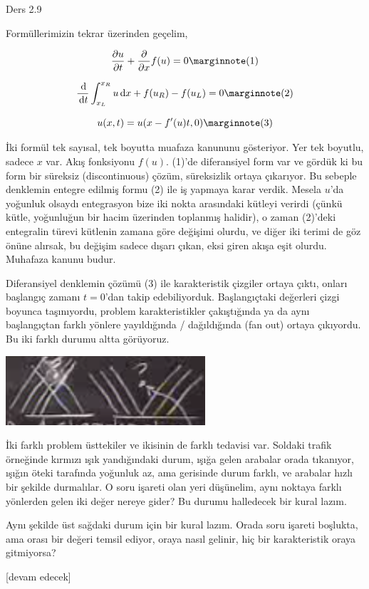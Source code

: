 \documentclass[12pt,fleqn]{article}\usepackage{../../common}
\begin{document}
Ders 2.9

Formüllerimizin tekrar üzerinden geçelim,

$$
\frac{\partial u}{\partial t} +
\frac{\partial }{\partial x} f(u) = 0
\mlabel{1}
$$

$$
\frac{\ud}{\ud t} \int_{x_L}^{x_R} u \ud x + f(u_R) - f(u_L) = 0
\mlabel{2}
$$

$$
u(x,t) = u(x - f'(u) t, 0)
\mlabel{3}
$$

İki formül tek sayısal, tek boyutta muafaza kanununu gösteriyor. Yer tek
boyutlu, sadece $x$ var. Akış fonksiyonu $f(u)$. (1)'de diferansiyel form var ve
gördük ki bu form bir süreksiz (discontinuous) çözüm, süreksizlik ortaya
çıkarıyor. Bu sebeple denklemin entegre edilmiş formu (2) ile iş yapmaya karar
verdik. Mesela $u$'da yoğunluk olsaydı entegrasyon bize iki nokta arasındaki
kütleyi verirdi (çünkü kütle, yoğunluğun bir hacim üzerinden toplanmış halidir),
o zaman (2)'deki entegralin türevi kütlenin zamana göre değişimi olurdu, ve
diğer iki terimi de göz önüne alırsak, bu değişim sadece dışarı çıkan, eksi
giren akışa eşit olurdu. Muhafaza kanunu budur. 

Diferansiyel denklemin çözümü (3) ile karakteristik çizgiler ortaya çıktı,
onları başlangıç zamanı $t=0$'dan takip edebiliyorduk. Başlangıçtaki değerleri
çizgi boyunca taşınıyordu, problem karakteristikler çakıştığında ya da aynı
başlangıçtan farklı yönlere yayıldığında / dağıldığında (fan out) ortaya
çıkıyordu. Bu iki farklı durumu altta görüyoruz.

\includegraphics[width=20em]{compscieng_2_09_01.png}

İki farklı problem üsttekiler ve ikisinin de farklı tedavisi var. Soldaki trafik
örneğinde kırmızı ışık yandığındaki durum, ışığa gelen arabalar orada tıkanıyor,
ışığın öteki tarafında yoğunluk az, ama gerisinde durum farklı, ve arabalar
hızlı bir şekilde durmalılar. O soru işareti olan yeri düşünelim, aynı noktaya
farklı yönlerden gelen iki değer nereye gider? Bu durumu halledecek bir kural
lazım.

Aynı şekilde üst sağdaki durum için bir kural lazım. Orada soru işareti
boşlukta, ama orası bir değeri temsil ediyor, oraya nasıl gelinir, hiç bir
karakteristik oraya gitmiyorsa?

















[devam edecek]
\end{document}
